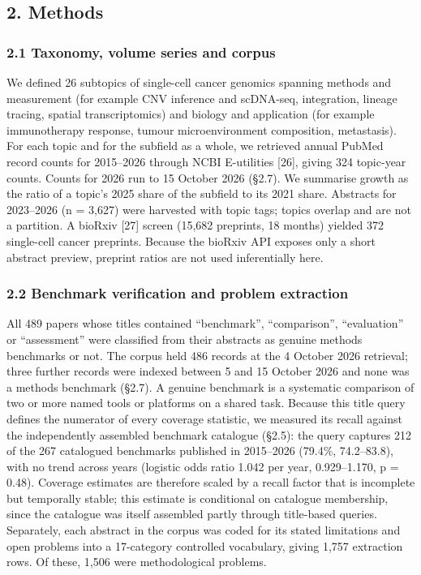 \documentclass[11pt]{article}
\begin{document}
\subsection{2. Methods}\label{methods}

\subsubsection{2.1 Taxonomy, volume series and
corpus}\label{taxonomy-volume-series-and-corpus}

We defined 26 subtopics of single-cell cancer genomics spanning methods
and measurement (for example CNV inference and scDNA-seq, integration,
lineage tracing, spatial transcriptomics) and biology and application
(for example immunotherapy response, tumour microenvironment
composition, metastasis). For each topic and for the subfield as a
whole, we retrieved annual PubMed record counts for 2015--2026 through
NCBI E-utilities {[}26{]}, giving 324 topic-year counts. Counts for 2026
run to 15 October 2026 (§2.7). We summarise growth as the ratio of a
topic's 2025 share of the subfield to its 2021 share. Abstracts for
2023--2026 (n = 3,627) were harvested with topic tags; topics overlap
and are not a partition. A bioRxiv {[}27{]} screen (15,682 preprints, 18
months) yielded 372 single-cell cancer preprints. Because the bioRxiv
API exposes only a short abstract preview, preprint ratios are not used
inferentially here.

\subsubsection{2.2 Benchmark verification and problem
extraction}\label{benchmark-verification-and-problem-extraction}

All 489 papers whose titles contained ``benchmark'', ``comparison'',
``evaluation'' or ``assessment'' were classified from their abstracts as
genuine methods benchmarks or not. The corpus held 486 records at the 4
October 2026 retrieval; three further records were indexed between 5 and
15 October 2026 and none was a methods benchmark (§2.7). A genuine
benchmark is a systematic comparison of two or more named tools or
platforms on a shared task. Because this title query defines the
numerator of every coverage statistic, we measured its recall against
the independently assembled benchmark catalogue (§2.5): the query
captures 212 of the 267 catalogued benchmarks published in 2015--2026
(79.4\%, 74.2--83.8), with no trend across years (logistic odds ratio
1.042 per year, 0.929--1.170, p = 0.48). Coverage estimates are
therefore scaled by a recall factor that is incomplete but temporally
stable; this estimate is conditional on catalogue membership, since the
catalogue was itself assembled partly through title-based queries.
Separately, each abstract in the corpus was coded for its stated
limitations and open problems into a 17-category controlled vocabulary,
giving 1,757 extraction rows. Of these, 1,506 were methodological
problems.
\end{document}
